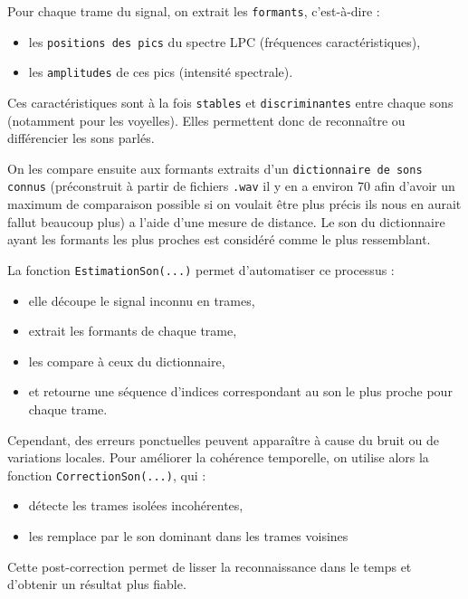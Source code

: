 \documentclass[11pt]{article}
\begin{document}
Pour chaque trame du signal, on extrait les \texttt{formants}, c’est-à-dire :
\begin{itemize}
\item les 	\texttt{positions des pics} du spectre LPC (fréquences caractéristiques),
\item les \texttt{amplitudes} de ces pics (intensité spectrale).
\end{itemize}

Ces caractéristiques sont à la fois \texttt{stables} et 	\texttt{discriminantes} entre chaque sons (notamment pour les voyelles). Elles permettent donc de reconnaître ou différencier les sons parlés.\newline

On les compare ensuite aux formants extraits d’un \texttt{dictionnaire de sons connus} (préconstruit à partir de fichiers \texttt{.wav} il y en a environ 70 afin d'avoir un maximum de comparaison possible si on voulait être plus précis ils nous en aurait fallut beaucoup plus) a l'aide d'une mesure de distance. Le son du dictionnaire ayant les formants les plus proches est considéré comme le plus ressemblant. \newline

La fonction \texttt{EstimationSon(...)} permet d’automatiser ce processus :
\begin{itemize}
\item elle découpe le signal inconnu en trames,
\item extrait les formants de chaque trame,
\item les compare à ceux du dictionnaire,
\item et retourne une séquence d’indices correspondant au son le plus proche pour chaque trame.\newline
\end{itemize}

Cependant, des erreurs ponctuelles peuvent apparaître à cause du bruit ou de variations locales. Pour améliorer la cohérence temporelle, on utilise alors la fonction \texttt{CorrectionSon(...)}, qui :

\begin{itemize}
    \item détecte les trames isolées incohérentes,
    \item les remplace par le son dominant dans les trames voisines
\end{itemize}
Cette post-correction permet de lisser la reconnaissance dans le temps et d’obtenir un résultat plus fiable.
\end{document}
